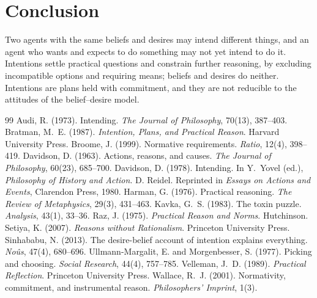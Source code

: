 \documentclass{situationist-preprint}
\begin{document}
\section{Conclusion}

Two agents with the same beliefs and desires may intend different things, and an agent who wants and expects to do something may not yet intend to do it. Intentions settle practical questions and constrain further reasoning, by excluding incompatible options and requiring means; beliefs and desires do neither. Intentions are plans held with commitment, and they are not reducible to the attitudes of the belief--desire model.

\begin{thebibliography}{99}\small
{} Audi, R. (1973). Intending. \emph{The Journal of Philosophy}, 70(13), 387--403.
 Bratman, M.~E. (1987). \emph{Intention, Plans, and Practical Reason}. Harvard University Press.
 Broome, J. (1999). Normative requirements. \emph{Ratio}, 12(4), 398--419.
 Davidson, D. (1963). Actions, reasons, and causes. \emph{The Journal of Philosophy}, 60(23), 685--700.
 Davidson, D. (1978). Intending. In Y.~Yovel (ed.), \emph{Philosophy of History and Action}. D. Reidel. Reprinted in \emph{Essays on Actions and Events}, Clarendon Press, 1980.
 Harman, G. (1976). Practical reasoning. \emph{The Review of Metaphysics}, 29(3), 431--463.
 Kavka, G.~S. (1983). The toxin puzzle. \emph{Analysis}, 43(1), 33--36.
 Raz, J. (1975). \emph{Practical Reason and Norms}. Hutchinson.
 Setiya, K. (2007). \emph{Reasons without Rationalism}. Princeton University Press.
 Sinhababu, N. (2013). The desire-belief account of intention explains everything. \emph{No\^us}, 47(4), 680--696.
 Ullmann-Margalit, E. and Morgenbesser, S. (1977). Picking and choosing. \emph{Social Research}, 44(4), 757--785.
 Velleman, J.~D. (1989). \emph{Practical Reflection}. Princeton University Press.
 Wallace, R.~J. (2001). Normativity, commitment, and instrumental reason. \emph{Philosophers' Imprint}, 1(3).
\end{thebibliography}
\end{document}
